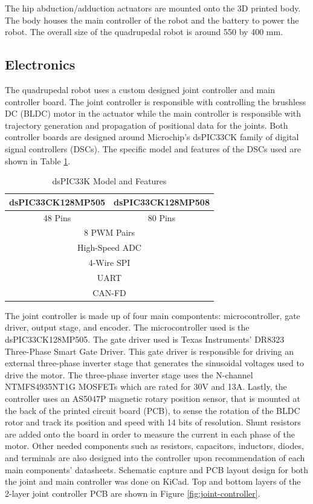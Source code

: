 \documentclass[english]{upeeei}
\providecommand{\tabularnewline}{\\}
\begin{document}
The hip abduction/adduction actuators are mounted onto the 3D printed body. The body houses the main controller of the robot and the battery to power the robot. The overall size of the quadrupedal robot is around 550 by 400 mm.

\subsection{Electronics}

The quadrupedal robot uses a custom designed joint controller and main controller board. The joint controller is responsible with controlling the brushless DC (BLDC) motor in the actuator while the main controller is responsible with trajectory generation and propagation of positional data for the joints. Both controller boards are designed around Microchip's dsPIC33CK family of digital signal controllers (DSCs). The specific model and features of the DSCs used are shown in Table \ref{tab:dspic-specs}.

\begin{table}[H]
\caption{dsPIC33K Model and Features\label{tab:dspic-specs}}

\centering{}
\begin{tabular}{|c|c|}
\hline 
dsPIC33CK128MP505 & dsPIC33CK128MP508\tabularnewline
\hline 
\hline 
48 Pins & 80 Pins\tabularnewline
\hline 
\multicolumn{2}{|c|}{8 PWM Pairs}\tabularnewline
\hline 
\multicolumn{2}{|c|}{High-Speed ADC}\tabularnewline
\hline 
\multicolumn{2}{|c|}{4-Wire SPI}\tabularnewline
\hline 
\multicolumn{2}{|c|}{UART}\tabularnewline
\hline 
\multicolumn{2}{|c|}{CAN-FD}\tabularnewline
\hline 
\hline 
\end{tabular}
\end{table}

The joint controller is made up of four main compontents: microcontroller, gate driver, output stage, and encoder. The microcontroller used is the dsPIC33CK128MP505. The gate driver used is Texas Instruments' DR8323 Three-Phase Smart Gate Driver. This gate driver is responsible for driving an external three-phase inverter stage that generates the sinusoidal voltages used to drive the motor. The three-phase inverter stage uses the N-channel NTMFS4935NT1G MOSFETs which are rated for 30V and 13A. Lastly, the controller uses an AS5047P magnetic rotary position sensor, that is mounted at the back of the printed circuit board (PCB), to sense the rotation of the BLDC rotor and track its position and speed with 14 bits of resolution. Shunt resistors are  added onto the board in order to measure the current in each phase of the motor. Other needed components such as resistors, capacitors, inductors, diodes, and terminals are also designed into the controller upon recommendation of each main components' datasheets. Schematic capture and PCB layout design for both the joint and main controller was done on KiCad. Top and bottom layers of the 2-layer joint controller PCB are shown in Figure \ref{fig:joint-controller}.
\end{document}
